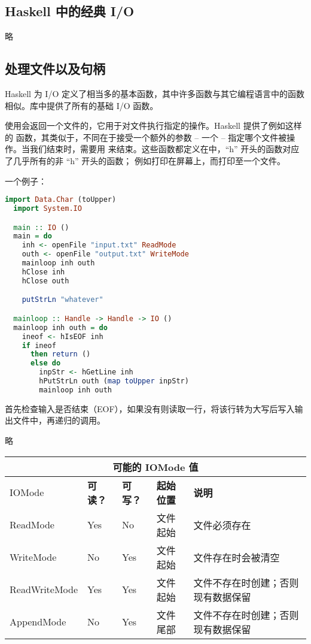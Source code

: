 \documentclass[./main.tex]{subfiles}
\begin{document}
\subsection*{Haskell 中的经典 I/O}

略

\subsection*{处理文件以及句柄}

Haskell 为 I/O 定义了相当多的基本函数，其中许多函数与其它编程语言中的函数相似。库中提供了所有的基础 I/O 函数。

使用会返回一个文件的，它用于对文件执行指定的操作。Haskell 提供了例如这样的
函数，其类似于，不同在于接受一个额外的参数 -- 一个 -- 指定哪个文件被操作。当我们结束时，需要用
来结束。这些函数都定义在中，“h” 开头的函数对应了几乎所有的非 “h” 开头的函数；
例如打印在屏幕上，而打印至一个文件。

一个例子：

\begin{lstlisting}[language=Haskell]
  import Data.Char (toUpper)
  import System.IO

  main :: IO ()
  main = do
    inh <- openFile "input.txt" ReadMode
    outh <- openFile "output.txt" WriteMode
    mainloop inh outh
    hClose inh
    hClose outh

    putStrLn "whatever"

  mainloop :: Handle -> Handle -> IO ()
  mainloop inh outh = do
    ineof <- hIsEOF inh
    if ineof
      then return ()
      else do
        inpStr <- hGetLine inh
        hPutStrLn outh (map toUpper inpStr)
        mainloop inh outh
\end{lstlisting}

首先检查输入是否结束（EOF），如果没有则读取一行，将该行转为大写后写入输出文件中，再递归的调用。

略

\begin{center}
  \begin{tabular}{|l|l|l|l|l|}
    \hline
    \multicolumn{5}{|c|}{\textbf{可能的 IOMode 值}}                                     \\
    \hline
    IOMode        & \textbf{可读？} & \textbf{可写？} & \textbf{起始位置} & \textbf{说明}       \\
    \hline
    ReadMode      & Yes          & No           & 文件起始          & 文件必须存在            \\
    WriteMode     & No           & Yes          & 文件起始          & 文件存在时会被清空         \\
    ReadWriteMode & Yes          & Yes          & 文件起始          & 文件不存在时创建；否则现有数据保留 \\
    AppendMode    & No           & Yes          & 文件尾部          & 文件不存在时创建；否则现有数据保留 \\
    \hline
  \end{tabular}
\end{center}
\end{document}
